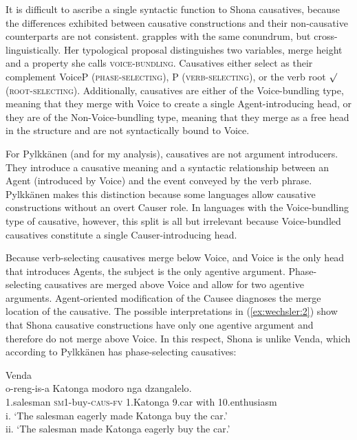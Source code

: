\documentclass[output=paper,modfonts,nonflat,colorlinks,citecolor=brown]{langsci/langscibook}
\begin{document}
It is difficult to ascribe a single syntactic function to Shona causatives, because the differences exhibited between causative constructions and their non-causative counterparts are not consistent. \citet{Pylkkänen2008} grapples with the same conundrum, but cross-linguistically. Her typological proposal distinguishes two variables, merge height and a property she calls \textsc{voice-bundling.} Causatives either select as their complement VoiceP  (\textsc{phase-selecting)}, {\liv}P \textsc{(verb-selec\-ting)}, or the verb root ${\surd}$ (\textsc{root-selecting)}. Additionally, causatives are either of the Voice-bundling type, meaning that they merge with Voice to create a single Agent-introducing head, or they are of the Non-Voice-bundling type, meaning that they merge as a free head in the structure and are not syntactically bound to Voice.

For Pylkkänen (and for my analysis), causatives are not argument introducers. They introduce a causative meaning and a syntactic relationship between an Agent (introduced by Voice) and the event conveyed by the verb phrase. Pylk\-kä\-nen makes this distinction because some languages allow causative constructions without an overt Causer role. In languages with the Voice-bundling type of causative, however, this split is all but irrelevant because Voice-bundled causatives constitute a single Causer-introducing head.

Because verb-selecting causatives merge below Voice, and Voice is the only head that introduces Agents, the subject is the only agentive argument. Phase-selecting causatives are merged above Voice and allow for two agentive arguments. Agent-oriented modification of the Causee diagnoses the merge location of the causative. The possible interpretations in (\ref{ex:wechsler:2}) show that Shona causative constructions have only one agentive argument and therefore do not merge above Voice. In this respect, Shona is unlike Venda, which according to Pylkkänen has phase-selecting causatives:

\ea\label{ex:wechsler:3}
Venda \citep[83]{Pylkkänen2008}\\
 {o-reng-is-a} {Katonga} {modoro} {nga} {dzangalelo}.\\
1.salesman \textsc{sm1-}buy\textsc{-caus-fv} 1.Katonga 9.car with 10.enthusiasm\\
\glt i. ‘The salesman eagerly made Katonga buy the car.’\\
ii. ‘The salesman made Katonga eagerly buy the car.’
\z
\end{document}
